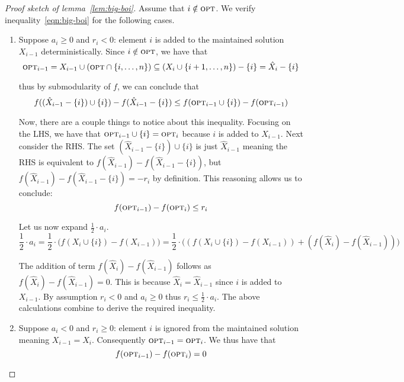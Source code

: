 \documentclass{article}
\begin{document}
\begin{proof}[Proof sketch of lemma~\ref{lem:big-boi}]
Assume that $i \notin \textup{\textsc{opt}}$. We verify inequality~\ref{eqn:big-boi} for the following cases.
\begin{enumerate}
\item Suppose $a_i \geq 0$ and $r_i < 0$: element $i$ is added to the maintained solution $X_{i-1}$ deterministically. Since $i \notin \textup{\textsc{opt}}$, we have that
\begin{equation*}
\textup{\textsc{opt}}_{i-1} = X_{i-1} \cup (\textup{\textsc{opt}} \cap \{ i, \ldots, n \}) \subseteq (X_i \cup \{ i + 1, \ldots, n \}) - \{ i \} = \hat{X}_i - \{ i \}
\end{equation*}

thus by submodularity of $f$, we can conclude that
\begin{equation*}
f((\hat{X}_{i-1} - \{ i \}) \cup \{ i \}) - f(\hat{X}_{i-1} - \{ i \})
\leq f(\textup{\textsc{opt}}_{i-1} \cup \{ i \}) - f(\textup{\textsc{opt}}_{i-1})
\end{equation*}

Now, there are a couple things to notice about this inequality. Focusing on the LHS, we have that $\textup{\textsc{opt}}_{i-1} \cup \{ i \} = \textup{\textsc{opt}}_i$ because $i$ is added to $X_{i-1}$. Next consider the RHS. The set $(\hat{X}_{i-1} - \{ i \}) \cup \{ i \}$ is just $\hat{X}_{i-1}$ meaning the RHS is equivalent to $f(\hat{X}_{i-1}) - f(\hat{X}_{i-1} - \{ i \})$, but $f(\hat{X}_{i-1}) - f(\hat{X}_{i-1} - \{ i \}) = -r_i$ by definition. This reasoning allows us to conclude:
\begin{equation}\label{eqn:case-1-lhs}
f(\textup{\textsc{opt}}_{i-1}) - f(\textup{\textsc{opt}}_i) \leq r_i
\end{equation}

Let us now expand $\frac{1}{2} \cdot a_i$.
\begin{equation}\label{eqn:case-1-rhs}
\frac{1}{2} \cdot a_i
= \frac{1}{2} \cdot \big( f(X_i \cup \{ i \}) - f(X_{i-1}) \big)
= \frac{1}{2} \cdot \big( (f(X_i \cup \{ i \}) - f(X_{i-1})) + (f(\hat{X}_i) - f(\hat{X}_{i-1})) \big)
\end{equation}

The addition of term $f(\hat{X}_i) - f(\hat{X}_{i-1})$ follows as $f(\hat{X}_i) - f(\hat{X}_{i-1}) = 0$. This is because $\hat{X}_i = \hat{X}_{i-1}$ since $i$ is added to $X_{i-1}$. By assumption $r_i < 0$ and $a_i \geq 0$ thus $r_i \leq \frac{1}{2} \cdot a_i$. The above calculations combine to derive the required inequality.

\item Suppose $a_i < 0$ and $r_i \geq 0$: element $i$ is ignored from the maintained solution meaning $X_{i-1} = X_i$. Consequently $\textup{\textsc{opt}}_{i-1} = \textup{\textsc{opt}}_i$. We thus have that
\begin{equation}\label{case-2-lhs}
f(\textup{\textsc{opt}}_{i-1}) - f(\textup{\textsc{opt}}_i) = 0
\end{equation}


\end{enumerate}
\end{proof}
\end{document}
